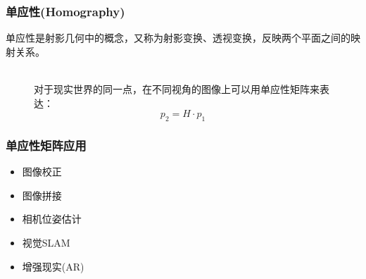 \documentclass[aspectratio=43]{beamer}
\begin{document}
	\begin{frame}
	\frametitle{单应性(Homography)}
	单应性是射影几何中的概念，又称为射影变换、透视变换，反映两个平面之间的映射关系。
	\begin{figure}
	\setcounter{subfigure}{0}
\\对于现实世界的同一点，在不同视角的图像上可以用单应性矩阵来表达：
	\begin{equation}\label{单应性}
		p_2=H\cdot p_1
	\end{equation}
	\end{figure}
	\end{frame}




	\begin{frame}
	\frametitle{单应性矩阵应用}
	\begin{itemize}
		\item 图像校正
		\item 图像拼接
		\item 相机位姿估计
		\item 视觉SLAM
		\item 增强现实(AR)
	\end{itemize}
	\end{frame}
\end{document}

